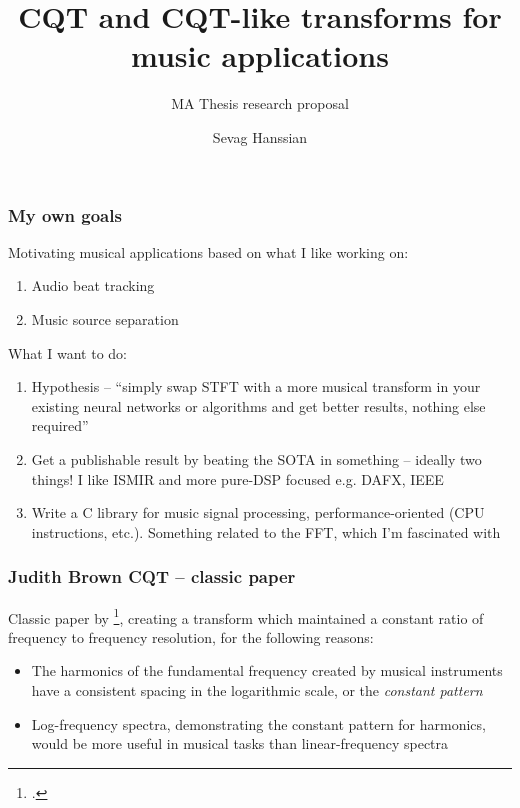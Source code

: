 \documentclass[usenames,dvipsnames]{beamer}
\title{CQT and CQT-like transforms for music applications}
\subtitle{MA Thesis research proposal}
\author{Sevag Hanssian}
\institute{DDMAL, McGill}
\begin{document}
\begin{frame}
\maketitle
\end{frame}

\begin{frame}
	\frametitle{My own goals}
	Motivating musical applications based on what I like working on:
	\begin{enumerate}
		\item
			Audio beat tracking
		\item
			Music source separation
	\end{enumerate}

	What I want to do:
	\begin{enumerate}
		\item
			Hypothesis -- ``simply swap STFT with a more musical transform in your existing neural networks or algorithms and get better results, nothing else required''
		\item
			Get a publishable result by beating the SOTA in something -- ideally two things! I like ISMIR and more pure-DSP focused e.g. DAFX, IEEE
		\item
			Write a C library for music signal processing, performance-oriented (CPU instructions, etc.). Something related to the FFT, which I'm fascinated with
	\end{enumerate}
\end{frame}

\begin{frame}
	\frametitle{Judith Brown CQT -- classic paper}
	Classic paper by \footcite{jbrown}, creating a transform which maintained a constant ratio of frequency to frequency resolution, for the following reasons:
\begin{itemize}
	\item
		The harmonics of the fundamental frequency created by musical instruments have a consistent spacing in the logarithmic scale, or the \textit{constant pattern}
	\item
		Log-frequency spectra, demonstrating the constant pattern for harmonics, would be more useful in musical tasks than linear-frequency spectra
	\end{itemize}
\end{frame}
\end{document}
